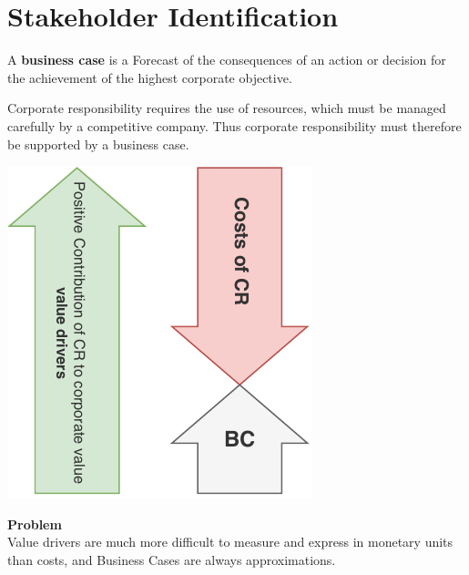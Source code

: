\documentclass[11pt]{article}
\theoremstyle{definition}
\begin{document}
\clearpage
\section{Stakeholder Identification}
\begin{definition}
	A \textbf{business case} is a Forecast of the consequences of an action or decision for the achievement of the highest corporate objective.
\end{definition}

Corporate responsibility requires the use of resources, which must be managed carefully by a competitive company. Thus corporate responsibility must therefore be supported by a business case.

\vspace{1em}
\noindent
\begin{minipage}{0.35\linewidth}
	\centering
	\includegraphics[width=\linewidth]{img/CR_difficulties.pdf}
\end{minipage}
\hfill
\begin{minipage}{0.6\linewidth}
	\textbf{Problem}\\ Value drivers are much more difficult to measure and express in monetary units than costs, and Business Cases are always approximations.
\end{minipage}
\end{document}
